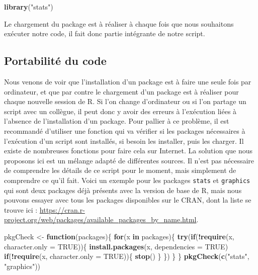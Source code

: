 \documentclass[]{book}
\newenvironment{Shaded}{\begin{snugshade}}{\end{snugshade}}
\newcommand{\ControlFlowTok}[1]{\textcolor[rgb]{0.13,0.29,0.53}{\textbf{#1}}}
\newcommand{\DataTypeTok}[1]{\textcolor[rgb]{0.13,0.29,0.53}{#1}}
\newcommand{\KeywordTok}[1]{\textcolor[rgb]{0.13,0.29,0.53}{\textbf{#1}}}
\newcommand{\NormalTok}[1]{#1}
\newcommand{\OperatorTok}[1]{\textcolor[rgb]{0.81,0.36,0.00}{\textbf{#1}}}
\newcommand{\OtherTok}[1]{\textcolor[rgb]{0.56,0.35,0.01}{#1}}
\newcommand{\StringTok}[1]{\textcolor[rgb]{0.31,0.60,0.02}{#1}}
\begin{document}
\begin{Shaded}
\begin{Highlighting}[]
\KeywordTok{library}\NormalTok{(}\StringTok{"stats"}\NormalTok{)}
\end{Highlighting}
\end{Shaded}

Le chargement du package est à réaliser à chaque fois que nous souhaitons exécuter notre code, il fait donc partie intégrante de notre script.

\hypertarget{portabilite-du-code}{%
\subsection{Portabilité du code}\label{portabilite-du-code}}

Nous venons de voir que l'installation d'un package est à faire une seule fois par ordinateur, et que par contre le chargement d'un package est à réaliser pour chaque nouvelle session de R. Si l'on change d'ordinateur ou si l'on partage un script avec un collègue, il peut donc y avoir des erreurs à l'exécution liées à l'absence de l'installation d'un package. Pour pallier à ce problème, il est recommandé d'utiliser une fonction qui va vérifier si les packages nécessaires à l'exécution d'un script sont installés, si besoin les installer, puis les charger. Il existe de nombreuses fonctions pour faire cela sur Internet. La solution que nous proposons ici est un mélange adapté de différentes sources. Il n'est pas nécessaire de comprendre les détails de ce script pour le moment, mais simplement de comprendre ce qu'il fait. Voici un exemple pour les packages \texttt{stats} et \texttt{graphics} qui sont deux packages déjà présents avec la version de base de R, mais nous pouvons essayer avec tous les packages disponibles sur le CRAN, dont la liste se trouve ici : \url{https://cran.r-project.org/web/packages/available_packages_by_name.html}.

\begin{Shaded}
\begin{Highlighting}[]
\NormalTok{pkgCheck <-}\StringTok{ }\ControlFlowTok{function}\NormalTok{(packages)\{}
    \ControlFlowTok{for}\NormalTok{(x }\ControlFlowTok{in}\NormalTok{ packages)\{}
        \KeywordTok{try}\NormalTok{(}\ControlFlowTok{if}\NormalTok{(}\OperatorTok{!}\KeywordTok{require}\NormalTok{(x, }\DataTypeTok{character.only =} \OtherTok{TRUE}\NormalTok{))\{}
            \KeywordTok{install.packages}\NormalTok{(x, }\DataTypeTok{dependencies =} \OtherTok{TRUE}\NormalTok{)}
            \ControlFlowTok{if}\NormalTok{(}\OperatorTok{!}\KeywordTok{require}\NormalTok{(x, }\DataTypeTok{character.only =} \OtherTok{TRUE}\NormalTok{))\{}
                \KeywordTok{stop}\NormalTok{()}
\NormalTok{            \}}
\NormalTok{        \})}
\NormalTok{    \}}
\NormalTok{\}}
\KeywordTok{pkgCheck}\NormalTok{(}\KeywordTok{c}\NormalTok{(}\StringTok{"stats"}\NormalTok{, }\StringTok{"graphics"}\NormalTok{))}
\end{Highlighting}
\end{Shaded}
\end{document}
